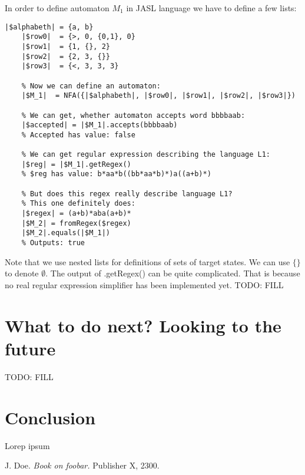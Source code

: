 \documentclass{ctuthesis}
\begin{document}
In order to define automaton $M_1$ in JASL language we have to define a few lists: 

\begin{minipage}{\linewidth}
\begin{lstlisting}[language = JASL]
	|$alphabeth| = {a, b}
	|$row0|  = {>, 0, {0,1}, 0}
	|$row1|  = {1, {}, 2}
	|$row2|  = {2, 3, {}}
	|$row3|  = {<, 3, 3, 3}
    
	% Now we can define an automaton:
	|$M_1|  = NFA({|$alphabeth|, |$row0|, |$row1|, |$row2|, |$row3|})

	% We can get, whether automaton accepts word bbbbaab:
	|$accepted| = |$M_1|.accepts(bbbbaab)   
	% Accepted has value: false 
	
	% We can get regular expression describing the language L1:
	|$reg| = |$M_1|.getRegex()
	% $reg has value: b*aa*b((bb*aa*b)*)a((a+b)*) 

	% But does this regex really describe language L1? 
	% This one definitely does:
	|$regex| = (a+b)*aba(a+b)*
	|$M_2| = fromRegex($regex)
	|$M_2|.equals(|$M_1|) 	
	% Outputs: true
\end{lstlisting}
\end{minipage}

Note that we use nested lists for definitions of sets of target states. We can use $\{\}$ to denote $\emptyset$. The output of .getRegex() can be quite complicated. That is because no real regular expression simplifier has been implemented yet.
TODO: FILL

\chapter{What to do next? Looking to the future}
TODO: FILL


\chapter{Conclusion}
Lorep ipsum \cite{doe}

\begin{thebibliography}{1}
 J. Doe. \emph{Book on foobar.} Publisher X,
2300.
\end{thebibliography}
\end{document}
